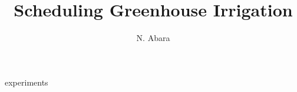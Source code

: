 \documentclass{article}
\title{Scheduling Greenhouse Irrigation}
\author{N. Abara}
\date{}
\begin{document}
\maketitle





{experiments}



\printbibliography
\end{document}
